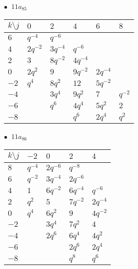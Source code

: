 \begin{minipage}{\linewidth}
$\bullet\ $ $11a_{85}$ \vspace{0.5em} \\
\begin{tabular}{l|lllll}
$k \setminus j$ & $0$ & $2$ & $4$ & $6$ & $8$ \\
\hline
$6$ & $q^{-4}$ & $q^{-6}$ &  &  &  \\
$4$ & $2q^{-2}$ & $3q^{-4}$ & $q^{-6}$ &  &  \\
$2$ & $3$ & $8q^{-2}$ & $4q^{-4}$ &  &  \\
$0$ & $2q^{2}$ & $9$ & $9q^{-2}$ & $2q^{-4}$ &  \\
$-2$ & $q^{4}$ & $8q^{2}$ & $12$ & $5q^{-2}$ &  \\
$-4$ &  & $3q^{4}$ & $9q^{2}$ & $7$ & $q^{-2}$ \\
$-6$ &  & $q^{6}$ & $4q^{4}$ & $5q^{2}$ & $2$ \\
$-8$ &  &  & $q^{6}$ & $2q^{4}$ & $q^{2}$ \\
\end{tabular}
\vspace{2em}
\end{minipage}
%
\begin{minipage}{\linewidth}
$\bullet\ $ $11a_{86}$ \vspace{0.5em} \\
\begin{tabular}{l|llll}
$k \setminus j$ & $-2$ & $0$ & $2$ & $4$ \\
\hline
$8$ & $q^{-4}$ & $2q^{-6}$ & $q^{-8}$ &  \\
$6$ & $q^{-2}$ & $3q^{-4}$ & $2q^{-6}$ &  \\
$4$ & $1$ & $6q^{-2}$ & $6q^{-4}$ & $q^{-6}$ \\
$2$ & $q^{2}$ & $5$ & $7q^{-2}$ & $2q^{-4}$ \\
$0$ & $q^{4}$ & $6q^{2}$ & $9$ & $4q^{-2}$ \\
$-2$ &  & $3q^{4}$ & $7q^{2}$ & $4$ \\
$-4$ &  & $2q^{6}$ & $6q^{4}$ & $4q^{2}$ \\
$-6$ &  &  & $2q^{6}$ & $2q^{4}$ \\
$-8$ &  &  & $q^{8}$ & $q^{6}$ \\
\end{tabular}
\vspace{2em}
\end{minipage}
%
